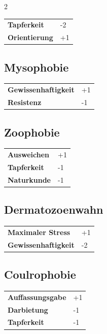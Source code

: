 \begin{multicols}{2}
    \begin{tabular}{@{}ll@{}}
        \textbf{Tapferkeit} & -2\\
        \textbf{Orientierung} & +1\\
    \end{tabular}

    \subsection*{Mysophobie}




    \begin{tabular}{@{}ll@{}}
        \textbf{Gewissenhaftigkeit} & +1\\
        \textbf{Resistenz} & -1\\
    \end{tabular}

    \subsection*{Zoophobie}




    \begin{tabular}{@{}ll@{}}
        \textbf{Ausweichen} & +1\\
        \textbf{Tapferkeit} & -1\\
        \textbf{Naturkunde} & -1\\
    \end{tabular}

    \subsection*{Dermatozoenwahn}




    \begin{tabular}{@{}ll@{}}
        \textbf{Maximaler Stress} & +1\\
        \textbf{Gewissenhaftigkeit} & -2\\
    \end{tabular}

    \subsection*{Coulrophobie}




    \begin{tabular}{@{}ll@{}}
        \textbf{Auffassungsgabe} & +1\\
        \textbf{Darbietung} & -1\\
        \textbf{Tapferkeit} & -1\\
    \end{tabular}


\end{multicols}
